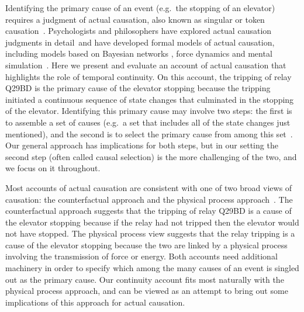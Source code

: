 \documentclass[10pt,letterpaper]{article}
\begin{document}
Identifying the primary cause of an event (e.g.\ the stopping of an elevator) requires a judgment of actual causation, also known as singular or token causation~\cite{danks17}. Psychologists and philosophers have explored actual causation judgments in detail~and have developed formal models of actual causation, including models based on Bayesian networks \cite{halpern16}, force dynamics \cite{wolfft17} and mental simulation~\cite{gerstenberg21}.  Here we present and evaluate an account of actual causation that highlights the role of temporal continuity.  On this account, the tripping of relay Q29BD is the primary cause of the elevator stopping because the tripping initiated a continuous sequence of state changes that culminated in the stopping of the elevator. Identifying this primary cause may involve two steps: the first is to assemble a set of causes (e.g.\ a set that includes all of the state changes just mentioned), and the second is to select the primary cause from among this set~\cite{stephanmw20e}. Our general approach has implications for both steps, but in our setting the second step (often called causal selection) is the more challenging of the two, and we focus on it throughout.  

Most accounts of actual causation are consistent with one of two broad views of causation: the counterfactual approach and the physical process approach~\cite{hall04}. The counterfactual approach suggests that the tripping of relay Q29BD is a cause of the elevator stopping because if the relay had not tripped then the elevator would not have stopped. The physical process view suggests that the relay tripping is a cause of the elevator stopping because the two are linked by a physical process involving the transmission of force or energy.  Both accounts need additional machinery in order to specify which among the many causes of an event is singled out as the primary cause. Our continuity account fits most naturally with the physical process approach, and can be viewed as an attempt to bring out some implications of this approach for actual causation. 
\end{document}
